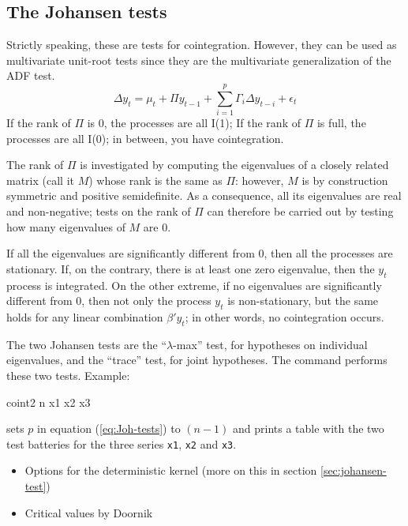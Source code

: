 \subsection{The Johansen tests}
\label{sec:Joh-test}

Strictly speaking, these are tests for cointegration. However, they
can be used as multivariate unit-root tests since they are the
multivariate generalization of the ADF test.
\begin{equation}
  \label{eq:Joh-tests}
  \Delta y_t = \mu_t + \Pi y_{t-1} + \sum_{i=1}^p \Gamma_i \Delta
  y_{t-i} + \epsilon_t
\end{equation}
If the rank of $\Pi$ is 0, the processes are all I(1); If the rank of
$\Pi$ is full, the processes are all I(0); in between, you have
cointegration.

The rank of $\Pi$ is investigated by computing the eigenvalues of a
closely related matrix (call it $M$) whose rank is the same as $\Pi$:
however, $M$ is by construction symmetric and positive semidefinite.
As a consequence, all its eigenvalues are real and non-negative; tests
on the rank of $\Pi$ can therefore be carried out by testing how many
eigenvalues of $M$ are 0.

If all the eigenvalues are significantly different from 0, then all the
processes are stationary. If, on the contrary, there is at least one
zero eigenvalue, then the $y_t$ process is integrated. On the other
extreme, if no eigenvalues are significantly different from 0, then not
only the process $y_t$ is non-stationary, but the same holds for any
linear combination $\beta'y_t$; in other words, no cointegration
occurs.

The two Johansen tests are the ``$\lambda$-max'' test, for hypotheses
on individual eigenvalues, and the ``trace'' test, for joint
hypotheses.  The  command  performs these two
tests.  Example:
\begin{code}
  coint2 n x1 x2 x3
\end{code}
sets $p$ in equation (\ref{eq:Joh-tests}) to $(n-1)$ and prints a table
with the two test batteries for the three series \verb|x1|, \verb|x2|
and \verb|x3|.
 
\begin{itemize}
\item Options for the deterministic kernel (more on this in section
  \ref{sec:johansen-test})
\item Critical values by Doornik
\end{itemize}


